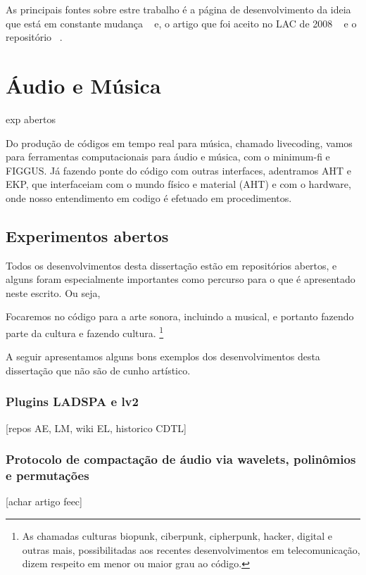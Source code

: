 As principais fontes sobre estre trabalho é a página de desenvolvimento da ideia
que está em constante mudança ~\cite{http://estudiolivre.org/tiki-index.php?page=fdp&highlight=fdp fdpel}
e, o artigo que foi aceito no LAC de 2008 ~\cite{http://www.estudiolivre.org/el-gallery_view.php?arquivoId=8221 fdplac2008}
e o repositório ~\cite{http://sourceforge.net/projects/fdpack/develop fdpsf}.

\section{Áudio e Música}

exp abertos

Do produção de códigos em tempo real para música, chamado livecoding,
vamos para ferramentas computacionais para áudio e música, com o minimum-fi
e FIGGUS. Já fazendo ponte do código com outras interfaces, adentramos AHT e EKP,
que interfaceiam com o mundo físico e material (AHT) e com o hardware, onde
nosso entendimento em codigo é efetuado em procedimentos.

  \subsection{Experimentos abertos}

Todos os desenvolvimentos desta dissertação estão em repositórios abertos\cite{repositorios-tese-dev},
e alguns foram especialmente importantes como percurso para o que é apresentado neste
escrito. Ou seja, 

Focaremos no código para a arte sonora,
incluindo a musical, e portanto fazendo parte da cultura e fazendo cultura.
\footnote{As chamadas culturas biopunk, ciberpunk, cipherpunk, hacker, digital e outras mais,
possibilitadas aos recentes desenvolvimentos em telecomunicação, dizem respeito em menor
ou maior grau ao código.}

A seguir apresentamos alguns bons exemplos dos desenvolvimentos
desta dissertação que não são de cunho artístico.

      \subsubsection{Plugins LADSPA e lv2}
      [repos AE, LM, wiki EL, historico CDTL]


      \subsubsection{Protocolo de compactação de áudio via wavelets, polinômios e permutações}
      [achar artigo feec]


